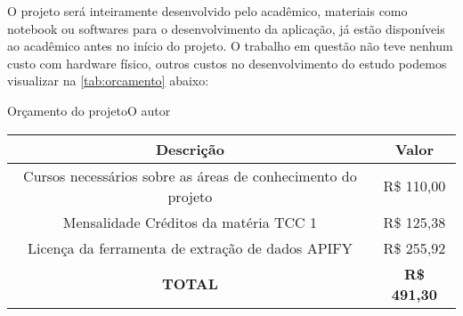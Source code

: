 \label{cap:orcamento}

O projeto será inteiramente desenvolvido pelo acadêmico, materiais como
notebook ou softwares para o desenvolvimento da aplicação, já estão disponíveis ao
acadêmico antes no início do projeto. O trabalho em questão não teve nenhum custo com hardware físico,
outros custos no desenvolvimento do estudo podemos visualizar na \autoref{tab:orcamento} abaixo:

\begin{tabela}{Orçamento do projeto}{O autor} 
    \label{tab:orcamento}
    \centering
    \begin{adjustbox}{width=\textwidth}
        \begin{tabular}{|c|c|}
            \hline
            \rowcolor[HTML]{C0C0C0} 
            \textbf{Descrição}                                           & \textbf{Valor}                             \\ \hline
            Cursos necessários sobre as áreas de conhecimento do projeto & R\$ 110,00                                 \\ \hline
            Mensalidade Créditos da matéria TCC 1                        & R\$ 125,38                                 \\ \hline
            Licença da ferramenta de extração de dados APIFY             & R\$ 255,92                                 \\ \hline
            {\color[HTML]{FE0000} \textbf{TOTAL}}                        & {\color[HTML]{FE0000} \textbf{R\$ 491,30}} \\ \hline
            \end{tabular}
    \end{adjustbox}
\end{tabela}